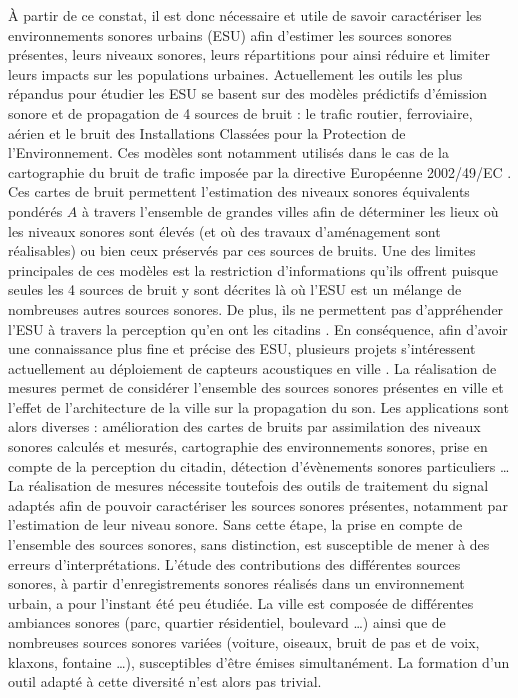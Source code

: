 À partir de ce constat, il est donc nécessaire et utile de savoir caractériser les environnements sonores urbains (ESU) afin d'estimer les sources sonores présentes, leurs niveaux sonores, leurs répartitions pour ainsi réduire et limiter leurs impacts sur les populations urbaines.
Actuellement les outils les plus répandus pour étudier les ESU se basent sur des modèles prédictifs d'émission sonore et de propagation de 4 sources de bruit : le trafic routier, ferroviaire, aérien et le bruit des Installations Classées pour la Protection de l'Environnement. Ces modèles sont notamment utilisés dans le cas de la cartographie du bruit de trafic imposée par la directive Européenne 2002/49/EC \cite{directive}. Ces cartes de bruit permettent l'estimation des niveaux sonores équivalents pondérés $A$ à travers l'ensemble de grandes villes afin de déterminer les lieux où les niveaux sonores sont élevés (et où des travaux d'aménagement sont réalisables) ou bien ceux préservés par ces sources de bruits. Une des limites principales de ces modèles est la restriction d'informations qu'ils offrent puisque seules les 4 sources de bruit y sont décrites là où l'ESU est un mélange de nombreuses autres sources sonores. De plus, ils ne permettent pas d'appréhender l'ESU à travers la perception qu'en ont les citadins \cite{aumond2017modeling}. 
En conséquence, afin d'avoir une connaissance plus fine et précise des ESU, plusieurs projets s'intéressent actuellement au déploiement de capteurs acoustiques en ville \cite{picaut2017characterization,zambon2017life}. La réalisation de mesures permet de considérer l'ensemble des sources sonores présentes en ville et l'effet de l'architecture de la ville sur la propagation du son. Les applications sont alors diverses : amélioration des cartes de bruits par assimilation des niveaux sonores calculés et mesurés, cartographie des environnements sonores, prise en compte de la perception du citadin, détection d'évènements sonores particuliers \dots{}
La réalisation de mesures nécessite toutefois des outils de traitement du signal adaptés afin de pouvoir caractériser les sources sonores présentes, notamment par l'estimation de leur niveau sonore. Sans cette étape, la prise en compte de l'ensemble des sources sonores, sans distinction, est susceptible de mener à des erreurs d'interprétations. L'étude des contributions des différentes sources sonores, à partir d'enregistrements sonores réalisés dans un environnement urbain, a pour l'instant été peu étudiée. 
La ville est composée de différentes ambiances sonores (parc, quartier résidentiel, boulevard \dots{}) ainsi que de nombreuses sources sonores variées (voiture, oiseaux, bruit de pas et de voix, klaxons, fontaine \dots{}), susceptibles d'être émises simultanément. La formation d'un outil adapté à cette diversité n'est alors pas trivial.


